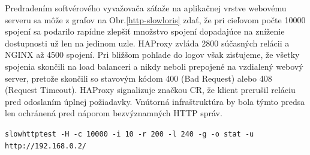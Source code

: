 \documentclass[12pt, a4paper]{article}
\begin{document}
Predradením softvérového vyvažovača záťaže na aplikačnej vrstve webovému serveru sa môže z grafov
na Obr.\ref{http-slowloris} zdať, že pri cieľovom počte 10000 spojení sa podarilo rapídne zlepšiť
množstvo spojení dopadajúce na zníženie dostupnosti už len na jedinom uzle. HAProxy zvláda 2800
súčasných relácii a NGINX až 4500 spojení. Pri bližšom pohľade do logov však zisťujeme, že všetky
spojenia skončili na load balanceri a nikdy neboli prepojené na vzdialený webový server, pretože skončili
so stavovým kódom 400 (Bad Request) alebo 408 (Request Timeout). HAProxy signalizuje značkou CR, že
klient prerušil reláciu pred odoslaním úplnej požiadavky. Vnútorná infraštruktúra by bola týmto
predsa len ochránená pred náporom bezvýznamných HTTP správ.

\begin{lrbox}{\shield}
\verb|slowhttptest -H -c 10000 -i 10 -r 200 -l 240 -g -o stat -u http://192.168.0.2/|
\end{lrbox}
\end{document}
